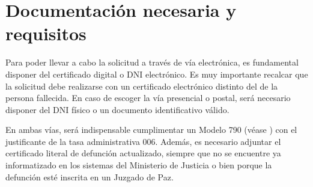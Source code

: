\section{Documentación necesaria y requisitos}
Para poder llevar a cabo la solicitud a través de vía electrónica, es fundamental disponer del certificado digital o DNI electrónico. Es muy importante recalcar que la solicitud debe realizarse con un certificado electrónico distinto del de la persona fallecida. En caso de escoger la vía presencial o postal, será necesario disponer del DNI físico o un documento identificativo válido.

En ambas vías, será indispensable cumplimentar un Modelo 790 (véase ) con el justificante de la tasa administrativa 006. Además, es necesario adjuntar el certificado literal de defunción actualizado, siempre que no se encuentre ya informatizado en los sistemas del Ministerio de Justicia o bien porque la defunción esté inscrita en un Juzgado de Paz.


